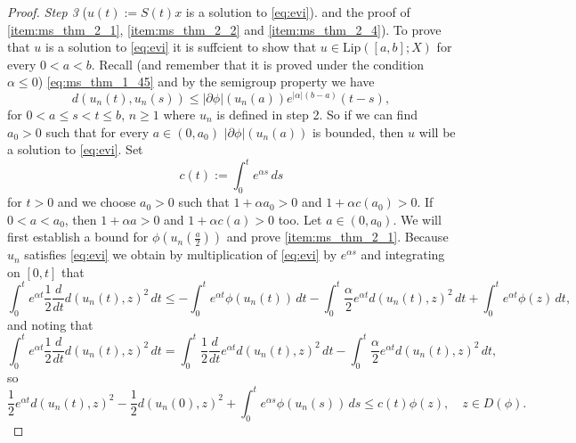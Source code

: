\documentclass[a4paper,11pt, leqno]{scrreprt} %
\renewcommand{\leq}{\leqslant}
\renewcommand{\leq}{\leqslant}
\renewcommand{\geq}{\geqslant}
\theoremstyle{change}
\theoremstyle{nonumberplain}
\newtheorem{proof}{Proof}
\begin{document}
\begin{proof}
  \textit{Step 3} ($u(t) := S(t)x$ is a solution to
  \eqref{eq:evi}). and the proof of \ref{item:ms_thm_2_1},
  \ref{item:ms_thm_2_2} and \ref{item:ms_thm_2_4}). To prove that $u$
  is a solution to \eqref{eq:evi} it is suffcient to show that $u \in
  \text{Lip}([a,b]; X)$ for every $0 < a < b$. Recall (and remember
  that it is proved under the condition $\alpha \leq 0$)
  \eqref{eq:ms_thm_1_45} and by the semigroup property we have
  \begin{equation}
    \label{eq:ms_thm_2_19}
    d(u_n(t), u_n(s)) \leq |\partial \phi|(u_n(a)) e^{|\alpha|(b -
      a)}(t - s),
  \end{equation}
  for $0 < a \leq s < t \leq b$, $n \geq 1$ where $u_n$ is defined in
  step 2. So if we can find $a_0 > 0$ such that for every $a \in (0,
  a_0)$ $|\partial \phi|(u_n(a))$ is bounded, then $u$ will be a
  solution to \eqref{eq:evi}. Set
  \begin{equation}
    \label{eq:ms_thm_2_20}
    c(t) := \int_0^t e^{\alpha s} \, ds
  \end{equation}
  for $t > 0$ and we choose $a_0 > 0$ such that $1 + \alpha a_0 > 0$
  and $1 + \alpha c(a_0) > 0$. If $0 < a < a_0$, then $1 + \alpha a >
  0$ and $1 + \alpha c(a) > 0$ too. Let $a \in (0, a_0)$. We will
  first establish a bound for $\phi \left (u_n \left (\frac{a}2 \right
        ) \right )$ and prove \ref{item:ms_thm_2_1}. Because $u_n$
      satisfies \eqref{eq:evi} we obtain by multiplication of \eqref{eq:evi} by
      $e^{\alpha s}$ and integrating on $[0,t]$ that
  \begin{equation}
     \label{eq:ms_thm_2_21}
     \int_0^t e^{\alpha t} \frac12 \frac{d}{dt} d(u_n(t), z)^2 \, dt \leq
     -\int_0^t e^{\alpha t} \phi(u_n(t)) \, dt -
     \int_0^t \frac\alpha2 e^{\alpha t} d(u_n(t), z)^2 \, dt +
     \int_0^t e^{\alpha t} \phi(z) \, dt,
  \end{equation}
  and noting that
  \begin{equation}
    \label{eq:ms_thm_2_22}
    \int_0^t e^{\alpha t} \frac12 \frac{d}{dt} d(u_n(t), z)^2 \, dt =
    \int_0^t \frac12 \frac{d}{dt} e^{\alpha t} d(u_n(t), z)^2 \, dt -
    \int_0^t \frac\alpha2 e^{\alpha t} d(u_n(t), z)^2 \, dt,
  \end{equation}
  so
  \begin{equation}
    \label{eq:ms_thm_2_23}
    \frac12 e^{\alpha t} d(u_n(t), z)^2 - \frac12 d(u_n(0), z)^2 +
    \int_0^t e^{\alpha s} \phi(u_n(s)) \, ds \leq c(t) \phi(z), \quad
    z \in D(\phi).
  \end{equation}

\end{proof}
\end{document}
